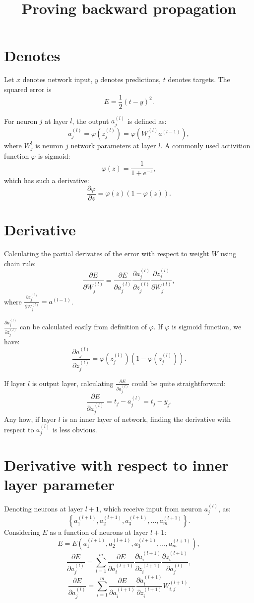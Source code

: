 

\title{Proving backward propagation}
\maketitle

\section{Denotes}
Let $x$ denotes network input, $y$ denotes predictions, $t$ denotes targets. The squared error is
\[
	E = \frac{1}{2} (t - y)^2.
\]
	
For neuron $j$ at layer $l$, the output $a_j^{(l)}$ is defined as:
\[
	a_j^{(l)} = \varphi(z_j^{(l)}) = \varphi(W_j^{(l)} a^{(l-1)}),
\]
where $W_j^l$ is neuron $j$ network parameters at layer $l$. A commonly used activition function
$\varphi$ is sigmoid:
\[
	\varphi(z) = \frac{1}{1 + e^{-z}},
\]
which has such a derivative:
\[
	\frac{\partial \varphi}{\partial z} = \varphi(z)(1 - \varphi(z)).
\]

\section{Derivative}
Calculating the partial derivates of the error with respect to weight $W$ using chain rule:
\[
	\frac{\partial E}{\partial W_j^{(l)}} =
		\frac {\partial E} {\partial a_j^{(l)}}
		\frac {\partial a_j^{(l)}} {\partial z_j^{(l)}}
		\frac {\partial z_j^{(l)}} {\partial W_j^{(l)}}
	,
\]
where $\frac {\partial z_j^{(l)}} {\partial W_j^{(l)}} = a^{(l-1)}$.

$\frac {\partial a_j^{(l)}} {\partial z_j^{(l)}}$ can be calculated easily from definition of $\varphi$.
If $\varphi$ is sigmoid function, we have:
\[
	\frac{\partial a_j^{(l)}}{\partial z_j^{(l)}} = \varphi(z_j^{(l)}) (1 - \varphi(z_j^{(l)})).
\]

If layer $l$ is output layer, calculating $\frac {\partial E} {\partial a_j^{(l)}}$ could be quite
straightforward:
\[
	\frac {\partial E} {\partial a_j^{(l)}} = t_j - a_j^{(l)} = t_j - y_j.
\]
Any how, if layer $l$ is an inner layer of network, finding the derivative with respect to $a_j^{(l)}$
is less obvious.

\section{Derivative with respect to inner layer parameter}
Denoting neurons at layer $l+1$, which receive input from neuron $a_j^{(l)}$, as:
\[
	\left\{ a_1^{(l+1)}, a_2^{(l+1)}, a_3^{(l+1)}, \dots, a_m^{(l+1)} \right\}.
\]
Considering $E$ as a function of neurons at layer $l+1$:
\[
	E = E( a_1^{(l+1)}, a_2^{(l+1)}, a_3^{(l+1)}, \dots, a_m^{(l+1)} ),
\]
\[
	\frac{\partial E}{\partial a_j^{(l)}}
		= \sum_{i=1}^{m}
		\frac{\partial E }{\partial a_i^{(l+1)}}
		\frac{\partial a_i^{(l+1)} }{\partial z_i^{(l+1)}}
		\frac{\partial z_i^{(l+1)} }{\partial a_j^{(l)}}
		,
\]
\[
	\frac{\partial E}{\partial a_j^{(l)}}	
		= \sum_{i=1}^{m}
		\frac{\partial E }{\partial a_i^{(l+1)}}
		\frac{\partial a_i^{(l+1)} }{\partial z_i^{(l+1)}}
		W_{i,j}^{(l+1)}
	.
\]


